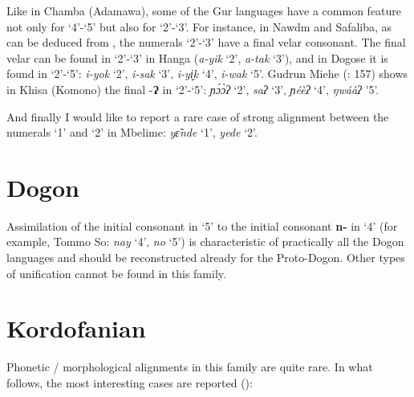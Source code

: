 Like in Chamba (Adamawa), some of the Gur languages have a common feature not only for ‘4’-‘5’ but also for ‘2’-‘3’. For instance, in Nawdm and Safaliba, as can be deduced from , the numerals ‘2’-‘3’ have a final velar consonant. The final velar can be found in ‘2’-‘3’ in Hanga (\textit{a-yik} ‘2’, \textit{a-tak} ‘3’), and in Dogose it is found in ‘2’-‘5’: \textit{i-yok} ‘2’, \textit{i-sak} ‘3’, \textit{i-yi̬k} ‘4’, \textit{i-wak} ‘5’. Gudrun Miehe (\citealt{MieheEtAl2007}: 157) shows in Khisa (Komono) the final -\textbf{Ɂ} in ‘2’-‘5’: \textit{ɲ{\'{ɔ}}{\`{ɔ}}ʔ} ‘2’, \textit{s{}aʔ} ‘3’, \textit{ɲéèʔ} ‘4’, \textit{ŋwáàʔ} ’5’.

And finally I would like to report a rare case of strong alignment between the numerals ‘1’ and ‘2’ in Mbelime: \textit{y{\~{ɛ}}nde} ‘1’, \textit{yede} ‘2’.

 
\section{Dogon}%

Assimilation of the initial consonant in ‘5’ to the initial consonant \textbf{n-} in ‘4’ (for example, Tommo So: \textit{nay} ‘4’, \textit{no} ‘5’) is characteristic of practically all the Dogon languages and should be reconstructed already for the Proto-Dogon. Other types of unification cannot be found in this family. 

 
\section{Kordofanian}%

Phonetic / morphological alignments in this family are quite rare. In what follows, the most interesting cases are reported (): 

